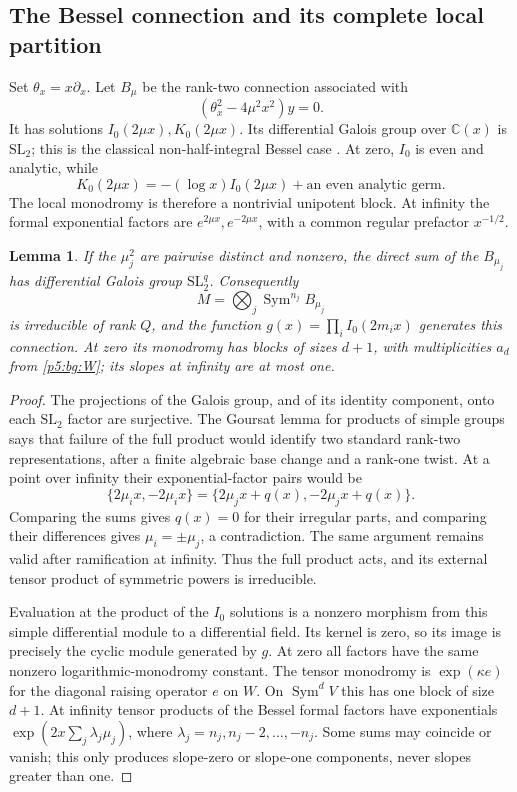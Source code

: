 \documentclass[11pt,a4paper]{article}
\newtheorem{lemma}[theorem]{Lemma}
\theoremstyle{definition}
\theoremstyle{remark}
\numberwithin{equation}{section}
\begin{document}
\subsection{The Bessel connection and its complete local partition}

Set $\theta_x=x\partial_x$.  Let $B_\mu$ be the rank-two connection
associated with
\begin{equation}\label{p5:bg:Bessel}
 (\theta_x^2-4\mu^2x^2)y=0.
\end{equation}
It has solutions $I_0(2\mu x),K_0(2\mu x)$.
Its differential Galois group over $\mathbb C(x)$ is
$\mathrm{SL}_2$; this is the classical non-half-integral Bessel
case \cite{p5:BG_Kolchin1968,p5:BG_vdPS2003}.  At zero, $I_0$ is even and analytic, while
\[
 K_0(2\mu x)=-(\log x)I_0(2\mu x)+\text{an even analytic germ}.
\]
The local monodromy is therefore a nontrivial unipotent block.
At infinity the formal exponential factors are
$e^{2\mu x},e^{-2\mu x}$, with a common regular prefactor
$x^{-1/2}$.

\begin{lemma}\label{p5:bg:galois}
If the $\mu_j^2$ are pairwise distinct and nonzero, the direct sum
of the $B_{\mu_j}$ has differential Galois group
$\mathrm{SL}_2^q$.  Consequently
\[
 M=\bigotimes_j\operatorname{Sym}^{n_j}B_{\mu_j}
\]
is irreducible of rank $Q$, and the function
$g(x)=\prod_i I_0(2m_i x)$ generates this connection.
At zero its monodromy has blocks of sizes $d+1$, with multiplicities
$a_d$ from \eqref{p5:bg:W}; its slopes at infinity are at most one.
\end{lemma}
\begin{proof}
The projections of the Galois group, and of its identity component,
onto each $\mathrm{SL}_2$ factor are surjective.  The Goursat
lemma for products of simple groups \cite[Proposition 1.8.2]{p5:BG_Katz1990} says that failure of the full
product would identify two standard rank-two representations,
after a finite algebraic base change and a rank-one twist.
At a point over infinity their exponential-factor pairs would be
\[
 \{2\mu_i x,-2\mu_i x\}
       =\{2\mu_jx+q(x),-2\mu_jx+q(x)\}.
\]
Comparing the sums gives $q(x)=0$ for their irregular parts, and
comparing their differences gives $\mu_i=\pm\mu_j$, a contradiction.
The same argument remains valid after ramification at infinity.
Thus the full product acts, and its external tensor product of
symmetric powers is irreducible.

Evaluation at the product of the $I_0$ solutions is a nonzero
morphism from this simple differential module to a differential
field.  Its kernel is zero, so its image is precisely the cyclic
module generated by $g$.  At zero all factors have the same
nonzero logarithmic-monodromy constant.  The tensor monodromy is
$\exp(\kappa e)$ for the diagonal raising operator $e$ on $W$.
On $\operatorname{Sym}^dV$ this has one block of size $d+1$.
At infinity tensor products of the Bessel formal factors have
exponentials $\exp(2x\sum_j\lambda_j\mu_j)$, where
$\lambda_j=n_j,n_j-2,\ldots,-n_j$.  Some sums may coincide or
vanish; this only produces slope-zero or slope-one components,
never slopes greater than one.
\end{proof}
\end{document}
